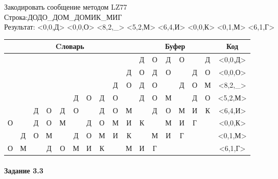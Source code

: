 \documentclass[a4paper, 12pt]{article}
\begin{document}
Закодировать сообщение методом LZ77\\
Строка:ДОДО\_ДОМ\_ДОМИК\_МИГ\\
Результат: <0,0,Д> <0,0,О> <8,2,\_> <5,2,М> <6,4,И> <0,0,К> <0,1,М> <6,1,Г>\\
\begin{table}[h!]
\centering
\begin{tabular}{|c|c|c|c|c|c|c|c|c|c|c|c|c|c|c|c|c|} 
\hline
\multicolumn{10}{|c|}{Cловарь} & \multicolumn{6}{c|}{Буфер} & Код  \\ \hline
  &   &   &   &   &   &   &   &   &   & \cellcolor[HTML]{8CE4F6} Д & О & Д & О &   & Д & <0,0,Д>
\\ \hline
  &   &   &   &   &   &   &   &   & Д & \cellcolor[HTML]{8CE4F6} О & Д & О &   & Д & О & <0,0,О>
\\ \hline
  &   &   &   &   &   &   &   & \cellcolor[HTML]{FFFF00} Д & \cellcolor[HTML]{FFFF00} О & \cellcolor[HTML]{FFFF00} Д & \cellcolor[HTML]{FFFF00} О & \cellcolor[HTML]{8CE4F6}   & Д & О & М & <8,2,\_>
\\ \hline
  &   &   &   &   & \cellcolor[HTML]{FFFF00} Д & \cellcolor[HTML]{FFFF00} О & Д & О &   & \cellcolor[HTML]{FFFF00} Д & \cellcolor[HTML]{FFFF00} О & \cellcolor[HTML]{8CE4F6} М &   & Д & О & <5,2,М>
\\ \hline
  &   & Д & О & Д & О & \cellcolor[HTML]{FFFF00}   & \cellcolor[HTML]{FFFF00} Д & \cellcolor[HTML]{FFFF00} О & \cellcolor[HTML]{FFFF00} М & \cellcolor[HTML]{FFFF00}   & \cellcolor[HTML]{FFFF00} Д & \cellcolor[HTML]{FFFF00} О & \cellcolor[HTML]{FFFF00} М & \cellcolor[HTML]{8CE4F6} И & К & <6,4,И>
\\ \hline
О &   & Д & О & М &   & Д & О & М & И & \cellcolor[HTML]{8CE4F6} К &   & М & И & Г &   & <0,0,К>
\\ \hline
\cellcolor[HTML]{FFFF00}   & Д & О & М &   & Д & О & М & И & К & \cellcolor[HTML]{FFFF00}   & \cellcolor[HTML]{8CE4F6} М & И & Г &   &   & <0,1,М>
\\ \hline
О & М &   & Д & О & М & \cellcolor[HTML]{FFFF00} И & К &   & М & \cellcolor[HTML]{FFFF00} И & \cellcolor[HTML]{8CE4F6} Г &   &   &   &   & <6,1,Г>
\\ \hline
\end{tabular}
\end{table}

\paragraph{Задание 3.3}
\end{document}
